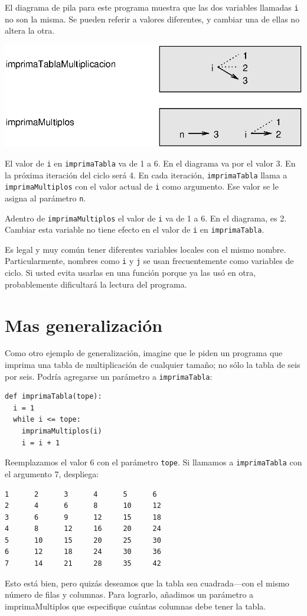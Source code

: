 El diagrama de pila para este programa muestra que las dos variables
llamadas \texttt{i} no son la misma. Se pueden referir a valores diferentes,
y cambiar una de ellas no altera la otra.

\beforefig \centerline{\includegraphics{illustrations/stack4}}
\afterfig

El valor de \texttt{i} en \texttt{imprimaTabla} va de 1 a 6. En el
diagrama va por el valor 3. En la próxima iteración del ciclo será
4. En cada iteración, \texttt{imprimaTabla} llama a \texttt{imprimaMultiplos}
con el valor actual de \texttt{i} como argumento. Ese valor se le
asigna al parámetro \texttt{n}.

Adentro de \texttt{imprimaMultiplos} el valor de \texttt{i} va de
1 a 6. En el diagrama, es 2. Cambiar esta variable no tiene efecto
en el valor de \texttt{i} en \texttt{imprimaTabla}.

Es legal y muy común tener diferentes variables locales con el mismo
nombre. Particularmente, nombres como \texttt{i} y \texttt{j} se usan
frecuentemente como variables de ciclo. Si usted evita usarlas en
una función porque ya las usó en otra, probablemente dificultará la
lectura del programa.


\section{Mas generalización}

Como otro ejemplo de generalización, imagine que le piden un programa
que imprima una tabla de multiplicación de cualquier tamaño; no sólo
la tabla de seis por seis. Podría agregarse un parámetro a \texttt{imprimaTabla}:
\begin{verbatim}
def imprimaTabla(tope):
  i = 1
  while i <= tope:
    imprimaMultiplos(i)
    i = i + 1
\end{verbatim}

Reemplazamos el valor 6 con el parámetro \texttt{tope}. Si llamamos
a \texttt{imprimaTabla} con el argumento 7, despliega:
\begin{verbatim}
1      2      3      4      5      6
2      4      6      8      10     12
3      6      9      12     15     18
4      8      12     16     20     24
5      10     15     20     25     30
6      12     18     24     30     36
7      14     21     28     35     42
\end{verbatim}
Esto está bien, pero quizás deseamos que la tabla sea cuadrada—con
el mismo número de filas y columnas. Para lograrlo, añadimos un parámetro
a imprimaMultiplos que especifique cuántas columnas debe tener la
tabla.

